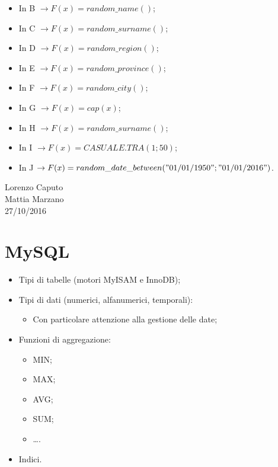 \begin{itemize}
\begin{itemize}

\item In B $\rightarrow F(x) =random\_name()$;
\item In C $\rightarrow F(x) =random\_surname()$;
\item In D $\rightarrow F(x) =random\_region()$;
\item In E $\rightarrow F(x) =random\_province()$;
\item In F $\rightarrow F(x) =random\_city()$;
\item In G $\rightarrow F(x) =cap(x)$;
\item In H $\rightarrow F(x) =random\_surname()$;
\item In I $\rightarrow F(x) =CASUALE.TRA(1;50)$;
\item In J $\rightarrow F(x) =random\_date\_between("01/01/1950";"01/01/2016")$. 

\end{itemize}

\end{itemize}


\begin{flushright}Lorenzo Caputo\\Mattia Marzano\\27/10/2016\end{flushright}


\section{MySQL}

\begin{itemize}

\item Tipi di tabelle (motori MyISAM e InnoDB);
\item Tipi di dati (numerici, alfanumerici, temporali):

\begin{itemize}
\item Con particolare attenzione alla gestione delle date;
\end{itemize}

\item Funzioni di aggregazione:

\begin{itemize}

\item MIN;
\item MAX;
\item AVG;
\item SUM;
\item \dots.

\end{itemize}

\item Indici.

\end{itemize}


